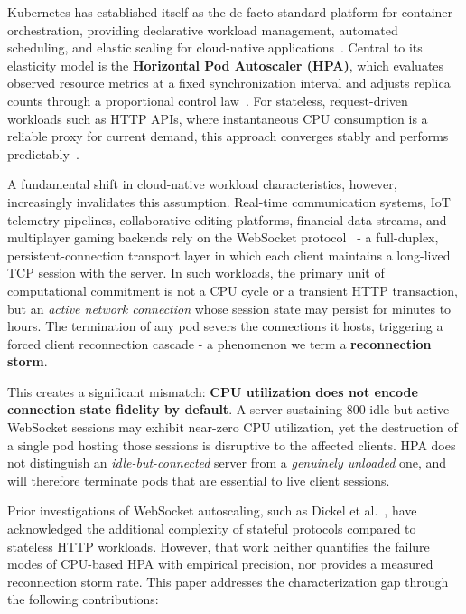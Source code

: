 \documentclass[twocolumn]{svjour3}
\begin{document}
Kubernetes has established itself as the de facto standard platform for container
orchestration, providing declarative workload management, automated scheduling, and
elastic scaling for cloud-native applications~\cite{burns2016borg,verma2015large}.
Central to its elasticity model is the \textbf{Horizontal Pod Autoscaler (HPA)}, which
evaluates observed resource metrics at a fixed synchronization interval and adjusts
replica counts through a proportional control law~\cite{k8s_hpa_docs,nguyen2020hpa}.
For stateless, request-driven workloads such as HTTP APIs, where instantaneous CPU
consumption is a reliable proxy for current demand, this approach converges stably and
performs predictably~\cite{casalicchio2019auto,lorido2014auto}.

A fundamental shift in cloud-native workload characteristics, however, increasingly
invalidates this assumption. Real-time communication systems, IoT telemetry pipelines,
collaborative editing platforms, financial data streams, and multiplayer gaming backends
rely on the WebSocket protocol~\cite{websocket_rfc} - a full-duplex, persistent-connection
transport layer in which each client maintains a long-lived TCP session with the server.
In such workloads, the primary unit of computational commitment is not a CPU cycle or a
transient HTTP transaction, but an \textit{active network connection} whose session state
may persist for minutes to hours. The termination of any pod severs the connections
it hosts, triggering a forced client reconnection cascade - a phenomenon we term a
\textbf{reconnection storm}.

This creates a significant mismatch: \textbf{CPU utilization does not encode connection
state fidelity by default}. A server sustaining 800 idle but active WebSocket sessions may
exhibit near-zero CPU utilization, yet the destruction of a single pod hosting those sessions
is disruptive to the affected clients. HPA does not distinguish an
\textit{idle-but-connected} server from a \textit{genuinely unloaded} one, and will
therefore terminate pods that are essential to live client sessions.

Prior investigations of WebSocket autoscaling, such as Dickel et al.~\cite{dickel2019stateful},
have acknowledged the additional complexity of stateful protocols compared to stateless HTTP
workloads. However, that work neither quantifies the failure modes of CPU-based HPA with
empirical precision, nor provides a measured reconnection storm rate. This paper addresses
the characterization gap through the following contributions:
\end{document}
